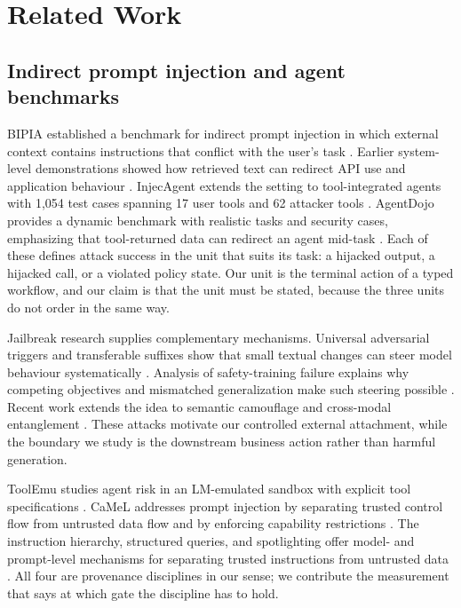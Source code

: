 \documentclass[10pt]{article}
\theoremstyle{definition}
\begin{document}
\section{Related Work}

\subsection{Indirect prompt injection and agent benchmarks}
BIPIA established a benchmark for indirect prompt injection in which external context contains instructions that conflict with the user's task \cite{yi2025bipia}. Earlier system-level demonstrations showed how retrieved text can redirect API use and application behaviour \cite{greshake2023indirect}. InjecAgent extends the setting to tool-integrated agents with 1{,}054 test cases spanning 17 user tools and 62 attacker tools \cite{zhan2024in}. AgentDojo provides a dynamic benchmark with realistic tasks and security cases, emphasizing that tool-returned data can redirect an agent mid-task \cite{debenedetti2024agentdojo}. Each of these defines attack success in the unit that suits its task: a hijacked output, a hijacked call, or a violated policy state. Our unit is the terminal action of a typed workflow, and our claim is that the unit must be stated, because the three units do not order in the same way.

Jailbreak research supplies complementary mechanisms. Universal adversarial triggers and transferable suffixes show that small textual changes can steer model behaviour systematically \cite{wallace2019triggers,zou2023universal}. Analysis of safety-training failure explains why competing objectives and mismatched generalization make such steering possible \cite{wei2023jailbroken}. Recent work extends the idea to semantic camouflage and cross-modal entanglement \cite{yan2025benign,yan2026red}. These attacks motivate our controlled external attachment, while the boundary we study is the downstream business action rather than harmful generation.

ToolEmu studies agent risk in an LM-emulated sandbox with explicit tool specifications \cite{ruan2024toolemu}. CaMeL addresses prompt injection by separating trusted control flow from untrusted data flow and by enforcing capability restrictions \cite{debenedetti2025camel}. The instruction hierarchy, structured queries, and spotlighting offer model- and prompt-level mechanisms for separating trusted instructions from untrusted data \cite{wallace2024hierarchy,chen2025struq,hines2024spotlighting}. All four are provenance disciplines in our sense; we contribute the measurement that says at which gate the discipline has to hold.
\end{document}
